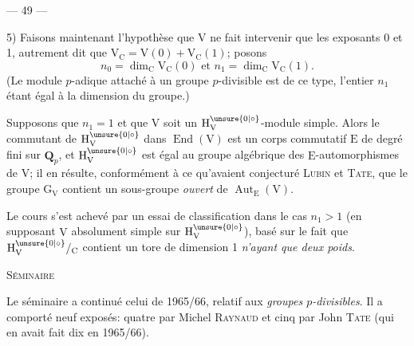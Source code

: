 \begin{center}--- 49 ---\end{center}

5) Faisons maintenant l'hypothèse que $\mathrm V$ ne fait intervenir que les exposants 0 et 1, autrement dit que $\mathrm V_{\mathrm C}=\mathrm V(0)+\mathrm V_{\mathrm C}(1)$; posons
\[
n_0=\dim_{\mathrm C}\mathrm V_{\mathrm C}(0)\text{ et }n_1=\dim_{\mathrm C}\mathrm V_{\mathrm C}(1).
\]
(Le module $p$-adique attaché à un groupe $p$-divisible est de ce type, l'entier $n_1$ étant égal à la dimension du groupe.)

Supposons que $n_1=1$ et que $\mathrm V$ soit un $\mathrm H_{\mathrm V}^{\unsure{0|\circ}}$-module simple. Alors le commutant de $\mathrm H_{\mathrm V}^{\unsure{0|\circ}}$ dans $\operatorname{End}(\mathrm V)$ est un corps commutatif $\mathrm E$ de degré fini sur $\mathbf Q_p$, et $\mathrm H_{\mathrm V}^{\unsure{0|\circ}}$ est égal au groupe algébrique des $\mathrm E$-automorphismes de $\mathrm V$; il en résulte, conformément à ce qu'avaient conjecturé \textsc{Lubin} et \textsc{Tate}, que le groupe $\mathrm G_{\mathrm V}$ contient un sous-groupe \textit{ouvert} de $\operatorname{Aut}_{\mathrm E}(\mathrm V)$.

Le cours s'est achevé par un essai de classification dans le cas $n_1>1$ (en supposant $\mathrm V$ absolument simple sur $\mathrm H_{\mathrm V}^{\unsure{0|\circ}}$), basé sur le fait que $\mathrm H_{\mathrm V}^{\unsure{0|\circ}}/_{\mathrm C}$ contient un tore de dimension 1 \textit{n'ayant que deux poids}.

\begin{center}\textsc{Séminaire}\end{center}

Le séminaire a continué celui de 1965/66, relatif aux \textit{groupes $p$-divisibles}. Il a comporté neuf exposés: quatre par Michel \textsc{Raynaud} et cinq par John \textsc{Tate} (qui en avait fait dix en 1965/66).

